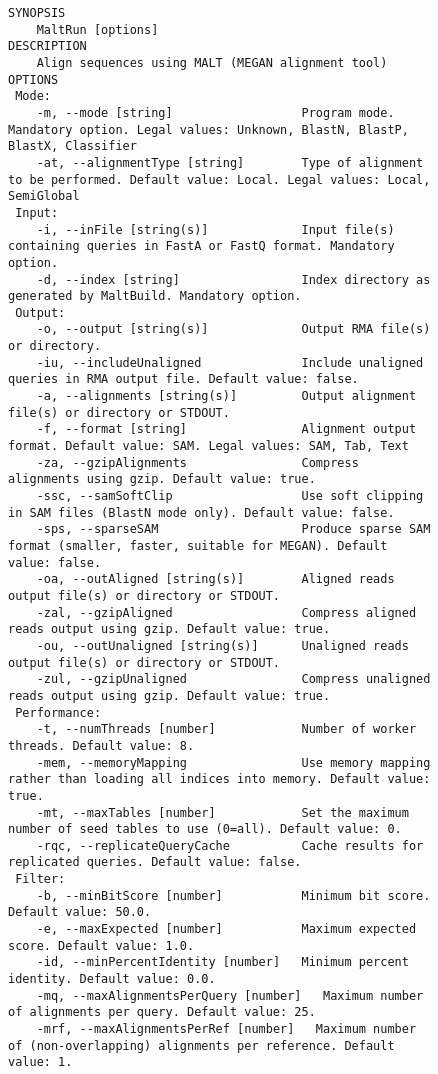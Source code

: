 \documentclass[11pt]{article}
\begin{document}
 \begin{figure}[h]
{\tiny
\begin{verbatim}
SYNOPSIS
	MaltRun [options]
DESCRIPTION
	Align sequences using MALT (MEGAN alignment tool)
OPTIONS
 Mode:
	-m, --mode [string]                  Program mode. Mandatory option. Legal values: Unknown, BlastN, BlastP, BlastX, Classifier
	-at, --alignmentType [string]        Type of alignment to be performed. Default value: Local. Legal values: Local, SemiGlobal
 Input:
	-i, --inFile [string(s)]             Input file(s) containing queries in FastA or FastQ format. Mandatory option.
	-d, --index [string]                 Index directory as generated by MaltBuild. Mandatory option.
 Output:
	-o, --output [string(s)]             Output RMA file(s) or directory. 
	-iu, --includeUnaligned              Include unaligned queries in RMA output file. Default value: false.
	-a, --alignments [string(s)]         Output alignment file(s) or directory or STDOUT. 
	-f, --format [string]                Alignment output format. Default value: SAM. Legal values: SAM, Tab, Text
	-za, --gzipAlignments                Compress alignments using gzip. Default value: true.
	-ssc, --samSoftClip                  Use soft clipping in SAM files (BlastN mode only). Default value: false.
	-sps, --sparseSAM                    Produce sparse SAM format (smaller, faster, suitable for MEGAN). Default value: false.
	-oa, --outAligned [string(s)]        Aligned reads output file(s) or directory or STDOUT. 
	-zal, --gzipAligned                  Compress aligned reads output using gzip. Default value: true.
	-ou, --outUnaligned [string(s)]      Unaligned reads output file(s) or directory or STDOUT. 
	-zul, --gzipUnaligned                Compress unaligned reads output using gzip. Default value: true.
 Performance:
	-t, --numThreads [number]            Number of worker threads. Default value: 8.
	-mem, --memoryMapping                Use memory mapping rather than loading all indices into memory. Default value: true.
	-mt, --maxTables [number]            Set the maximum number of seed tables to use (0=all). Default value: 0.
	-rqc, --replicateQueryCache          Cache results for replicated queries. Default value: false.
 Filter:
	-b, --minBitScore [number]           Minimum bit score. Default value: 50.0.
	-e, --maxExpected [number]           Maximum expected score. Default value: 1.0.
	-id, --minPercentIdentity [number]   Minimum percent identity. Default value: 0.0.
	-mq, --maxAlignmentsPerQuery [number]   Maximum number of alignments per query. Default value: 25.
	-mrf, --maxAlignmentsPerRef [number]   Maximum number of (non-overlapping) alignments per reference. Default value: 1.

\end{verbatim}}
\end{figure}
\end{document}
